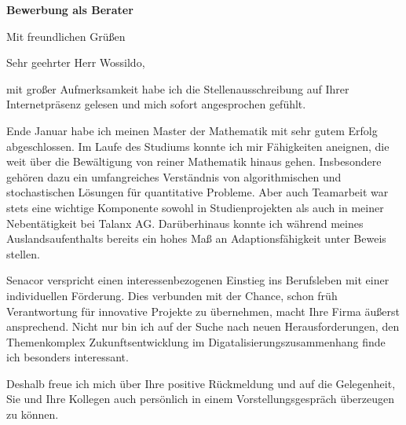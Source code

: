 \documentclass[11pt,a4paper,sans]{moderncv}        %
\date{13. März 2018}
\begin{document}

\opening{{\bfseries Bewerbung als Berater}}
\closing{Mit freundlichen Grüßen}
\makelettertitle

Sehr geehrter Herr Wossildo,
\begin{justify}mit großer Aufmerksamkeit habe ich die Stellenausschreibung auf Ihrer Internetpräsenz gelesen und mich sofort angesprochen gefühlt. 
	
	Ende Januar habe ich meinen Master der Mathematik mit sehr gutem Erfolg abgeschlossen.
	Im Laufe des Studiums konnte ich mir Fähigkeiten aneignen, die weit über die Bewältigung von reiner Mathematik hinaus gehen.
	Insbesondere gehören dazu ein umfangreiches Verständnis von algorithmischen und stochastischen Lösungen für quantitative Probleme.
	Aber auch Teamarbeit war stets eine wichtige Komponente sowohl in Studienprojekten als auch in meiner Nebentätigkeit bei Talanx AG. 
	Darüberhinaus konnte ich während meines Auslandsaufenthalts bereits ein hohes Maß an Adaptionsfähigkeit unter Beweis stellen.
	
	Senacor verspricht einen interessenbezogenen Einstieg ins Berufsleben mit einer individuellen Förderung. Dies verbunden mit der Chance, schon früh Verantwortung für innovative Projekte zu übernehmen, macht Ihre Firma äußerst ansprechend. Nicht nur bin ich auf der Suche nach neuen Herausforderungen, den Themenkomplex Zukunftsentwicklung im Digatalisierungszusammenhang finde ich besonders interessant. 
	
	Deshalb freue ich mich über Ihre positive Rückmeldung und auf die Gelegenheit, Sie und Ihre Kollegen auch persönlich in einem Vorstellungsgespräch überzeugen zu können.
\end{justify}

\makeletterclosing
\clearpage
\makecvtitle
\end{document}
